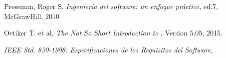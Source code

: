 \begin{thebibliography}{99} %
	
	Pressman, Roger S.
	\emph{Ingeniería del software: un enfoque práctico},
	ed.7,
	McGrawHill,
	2010
	
	Oetiker T. et al,
	\emph{The Not So Short Introduction to \LaTeXe},
	Version 5.05,
	2015.
	
	\emph{IEEE Std. 830-1998: Especificaciones de los Requisitos del Software},
	
\end{thebibliography}